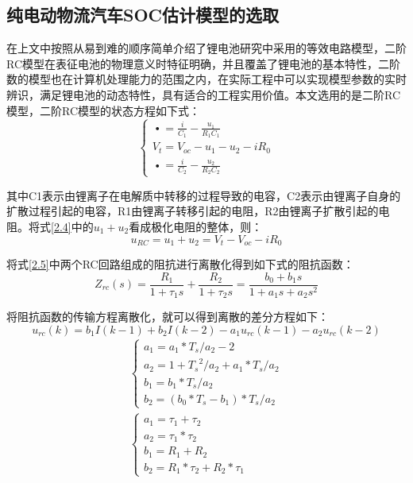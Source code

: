 \subsection{纯电动物流汽车SOC估计模型的选取}
在上文中按照从易到难的顺序简单介绍了锂电池研究中采用的等效电路模型，二阶RC模型在表征电池的物理意义时特征明确，并且覆盖了锂电池的基本特性，二阶数的模型也在计算机处理能力的范围之内，在实际工程中可以实现模型参数的实时辨识，满足锂电池的动态特性，具有适合的工程实用价值。本文选用的是二阶RC模型，二阶RC模型的状态方程如下式：
\begin{equation}\label{2.4}
\left\{ \begin{array}{l}
\mathop {{u_1}}\limits^ \bullet   = \frac{i}{{{C_1}}} - \frac{{{u_1}}}{{{R_1}{C_1}}}\\
{V_t} = {V_{oc}} - {u_1} - {u_2} - i{R_0}\\
\mathop {{u_2}}\limits^ \bullet   = \frac{i}{{{C_2}}} - \frac{{{u_2}}}{{{R_2}{C_2}}}
\end{array} \right.
\end{equation}

其中C1表示由锂离子在电解质中转移的过程导致的电容，C2表示由锂离子自身的扩散过程引起的电容，R1由锂离子转移引起的电阻，R2由锂离子扩散引起的电阻。将式\ref{2.4}中的${u_1} + {u_2}$看成极化电阻的整体，则：
\begin{equation}\label{2.5}
{u_{RC}} = {u_1} + {u_2} = {V_t} - {V_{oc}} - i{R_0}
\end{equation}

将式\ref{2.5}中两个RC回路组成的阻抗进行离散化得到如下式的阻抗函数：
\begin{equation}
{Z_{rc}}(s) = \frac{{{R_1}}}{{1 + {\tau _1}s}} + \frac{{{R_2}}}{{1 + {\tau _2}s}} = \frac{{{b_0} + {b_1}s}}{{1 + {a_1}s + {a_2}{s^2}}}
\end{equation}

将阻抗函数的传输方程离散化，就可以得到离散的差分方程如下：
\begin{equation}\label{2.7}
{u_{rc}}(k) = {b_1}I(k - 1) + {b_2}I(k - 2) - {a_1}{u_{rc}}(k - 1) - {a_2}{u_{rc}}(k - 2)
\end{equation}
\begin{equation}
\begin{array}{l}
\left\{ \begin{array}{l}
{a_1} = {a_1} * {T_s}/{a_2} - 2\\
{a_2} = 1 + {T_s}^2/{a_2} + {a_1} * {T_s}/{a_2}\\
{b_1} = {b_1} * {T_s}/{a_2}\\
{b_2} = ({b_0} * {T_s} - {b_1}) * {T_s}/{a_2}
\end{array} \right.\\
\left\{ \begin{array}{l}
{a_1} = {\tau _1} + {\tau _2}\\
{a_2} = {\tau _1} * {\tau _2}\\
{b_1} = {R_1} + {R_2}\\
{b_2} = {R_1} * {\tau _2} + {R_2} * {\tau _1}
\end{array} \right.
\end{array}
\end{equation}

